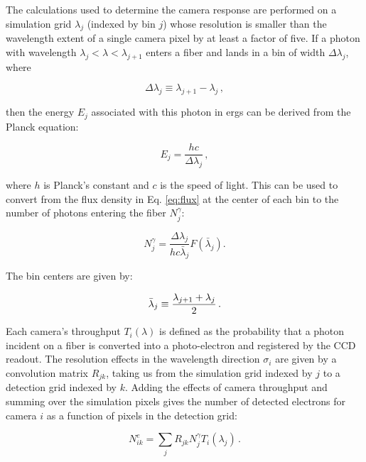 The calculations used to determine the camera response are performed on a simulation grid $\lambda_{j}$ (indexed by bin $j$) whose resolution is smaller than the wavelength extent of a single camera pixel by at least a factor of five. If a photon with wavelength $\lambda_{j} < \lambda < \lambda_{j+1}$ enters a fiber and lands in a bin of width $\Delta \lambda_{j}$, where

\begin{equation}
    \Delta \lambda_{j} \equiv \lambda_{j+1} - \lambda_{j}\,,
\end{equation}

then the energy $E_{j}$ associated with this photon in ergs can be derived from the Planck equation:

\begin{equation}
    E_{j} = \frac{hc}{\Delta \lambda_{j}}\,,
\end{equation}

where $h$ is Planck's constant and $c$ is the speed of light. This can be used to convert from the flux density in Eq. \ref{eq:flux} at the center of each bin to the number of photons entering the fiber $N_{j}^{\gamma}$:

\begin{equation}
    N_{j}^{\gamma} = \frac{\Delta \lambda_{j}}{hc\bar{\lambda}_{j}}F(\bar{\lambda}_{j}).
\end{equation} 

The bin centers are given by:

\begin{equation}
    \bar{\lambda}_{j} \equiv \frac{\lambda_{j+1} + \lambda_{j}}{2}\,.\\
\end{equation}

Each camera's throughput $T_{i}(\lambda)$ is defined as the probability that a photon incident on a fiber is converted into a photo-electron and registered by the CCD readout. The resolution effects in the wavelength direction $\sigma_{i}$ are given by a convolution matrix $R_{jk}$, taking us from the simulation grid indexed by $j$ to a detection grid indexed by $k$. Adding the effects of camera throughput and summing over the simulation pixels gives the number of detected electrons for camera $i$ as a function of pixels in the detection grid:

\begin{equation}
    N_{ik}^{e} = \sum_{j}R_{jk}N_{j}^{\gamma}T_{i}(\lambda_{j})\,.
\end{equation}

